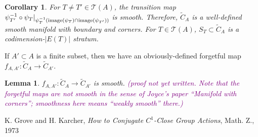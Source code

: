 \documentclass[11pt]{article}
\newtheorem{lmm}[thm]{Lemma}
\newtheorem{crl}[thm]{Corollary}
\theoremstyle{definition}
\theoremstyle{remark}
\def\wt#1{\widetilde{#1}}
\def\cT{\mathcal{T}}
\def\cmt#1{\textcolor{purple}{(#1)}}
\def\tn#1{\textnormal{#1}}
\begin{document}
\begin{crl}
For $T\neq T'\in \cT(A)$, the transition map $\psi_{T'}^{-1}\circ\psi_{T}|_{\psi_T^{-1}(\tn{image}(\psi_T)\cap\tn{image}(\psi_{T'}))}$ is smooth. 
Therefore, $\wt{C}_A$ is a well-defined smooth manifold with boundary and corners. For $T\in\cT(A)$, $S_T\subset \wt{C}_A$ is a codimension-$|E(T)|$ stratum. 
\end{crl}

If $A'\subset A$ is a finite subset, then we have an obviously-defined forgetful map $f_{A,A'}:\wt{C}_A\to\wt{C}_{A'}$. 

\begin{lmm}
$f_{A,A'}:\wt{C}_A\to\wt{C}_{A'}$ is smooth. \cmt{proof not yet written. Note that the forgetful maps are not smooth in the sense of Joyce's paper ``Manifold with corners''; smoothness here means ``weakly smooth'' there.}
\end{lmm}


\begin{thebibliography}{9}
 K. Grove and H. Karcher, {\it How to Conjugate $C^1$-Close Group Actions}, Math. Z., 1973
\end{thebibliography}
\end{document}
